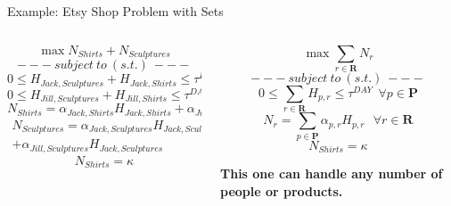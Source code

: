\documentclass[10pt, aspectratio=169]{beamer}
\begin{document}
\begin{frame}[t]{Example: Etsy Shop Problem with Sets}
    \begin{columns}[t]
        \begin{column}[t]{0.5\textwidth}
            $$\max N_{Shirts} + N_{Sculptures}$$
            $$---\ subject\ to\ (s.t.)\ ---$$
            $$0 \leq H_{Jack,Sculptures} + H_{Jack,Shirts} \leq \tau^{DAY}$$
            $$0 \leq H_{Jill,Sculptures} + H_{Jill,Shirts} \leq \tau^{DAY}$$
            $$N_{Shirts} = \alpha_{Jack,Shirts} H_{Jack,Shirts} + \alpha_{Jill,Shirts} H_{Jack,Shirts}$$
            \begin{equation}
                \begin{split}
                    N_{Sculptures} = \alpha_{Jack,Sculptures} H_{Jack,Sculptures} \\ + \alpha_{Jill,Sculptures} H_{Jack,Sculptures}
                \end{split}
                \tag*{}
            \end{equation}
            $$N_{Shirts} = \kappa$$
        \end{column}
        \begin{column}[t]{0.5\textwidth}
            $$\max \sum_{r\in\textbf{R}} N_{r}$$
            $$---\ subject\ to\ (s.t.)\ ---$$
            $$0 \leq \sum_{r \in \textbf{R}} H_{p,r} \leq \tau^{DAY} \ \ \forall p \in \textbf{P}$$
            $$N_{r} = \sum_{p \in \textbf{P}} \alpha_{p,r} H_{p,r}\ \ \ \forall r \in \textbf{R}$$
            $$N_{Shirts} = \kappa$$

            \vspace{0.7cm}
            \begin{center}
                \textbf{This one can handle any number of people or products.}
            \end{center}
        \end{column}
    \end{columns}
\end{frame}
\end{document}
